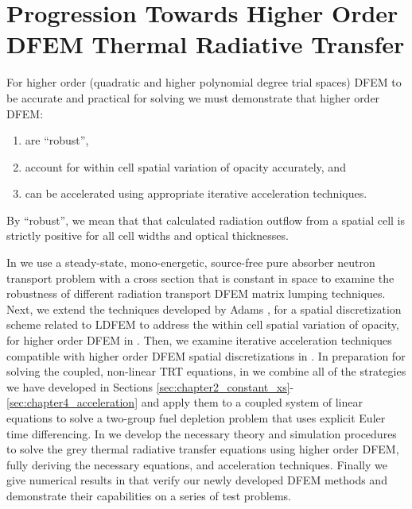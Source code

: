 \section{Progression Towards Higher Order DFEM Thermal Radiative Transfer}

For higher order (quadratic and higher polynomial degree trial spaces) DFEM to be accurate and practical for solving  we must demonstrate that higher order DFEM:
\begin{enumerate}
\item are ``robust'',
\item account for within cell spatial variation of opacity accurately, and
\item can be accelerated using appropriate iterative acceleration techniques.
\end{enumerate}
By ``robust'', we mean that that calculated radiation outflow from a spatial cell is strictly positive for all cell widths and optical thicknesses.

In  we use a steady-state, mono-energetic, source-free pure absorber neutron transport problem with a cross section that is constant in space to examine the robustness of different radiation transport DFEM matrix lumping techniques.
Next, we extend the techniques developed by Adams \cite{adams_scb,adams_nowak}, for a spatial discretization scheme related to LDFEM  to address the within cell spatial variation of opacity, for higher order DFEM in  .
Then, we examine iterative acceleration techniques compatible with higher order DFEM spatial discretizations in .
In preparation for solving the coupled, non-linear TRT equations, in  we combine all of the strategies we have developed in Sections \ref{sec:chapter2_constant_xs}-\ref{sec:chapter4_acceleration} and apply them to a coupled system of linear equations to solve a two-group fuel depletion problem that uses explicit Euler time differencing.
In  we develop the necessary theory and simulation procedures to solve the grey thermal radiative transfer equations using higher order DFEM, fully deriving the necessary  equations, and acceleration techniques. 
Finally we give numerical results in  that verify our newly developed DFEM methods and demonstrate their capabilities on a series of test problems. 


